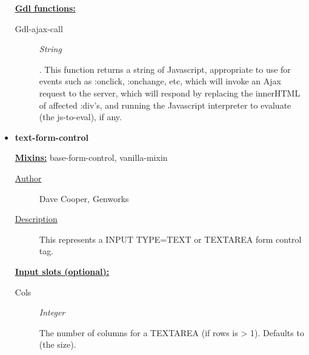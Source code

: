 \documentclass [11pt]{book}
\begin{document}
\begin{itemize}
\textbf{
\underline{Gdl functions:}}

\begin{description}

\item [Gdl-ajax-call]
\emph{String}

.
This function returns a string of Javascript, appropriate to use for events
such as :onclick, :onchange, etc, which will invoke an Ajax request to the
server, which will respond by replacing the innerHTML of affected :div's, and
running the Javascript interpreter to evaluate (the js-to-eval), if any.




\end{description}







\item {}
\label{prim:text-form-control}
\textbf{text-form-control}


\textbf{
\underline{Mixins:}} base-form-control, vanilla-mixin





\begin{description}

\item [
\underline{Author}]


Dave Cooper, Genworks



\item [
\underline{Description}]


This represents a INPUT TYPE=TEXT or TEXTAREA form control tag.



\end{description}








\textbf{
\underline{Input slots (optional):}}

\begin{description}

\item [Cols]
\emph{Integer}

 The number of columns for a TEXTAREA (if rows is > 1). Defaults to (the size).





\end{description}
\end{itemize}
\end{document}

